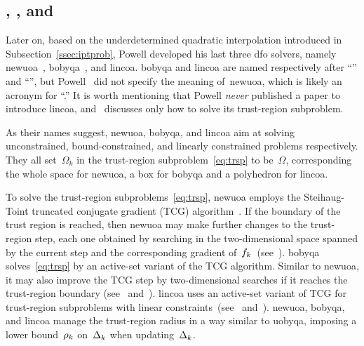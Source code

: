 \documentclass[
    smallextended,  %
    final,        %
]{svjour3}
\newcommand{\fsetm}[1][k]{\Omega_{#1}}
\newcommand{\fset}{\Omega}
\newcommand{\objm}[1][k]{\obj\ifthenelse{\equal{#1}{}}{}{_{#1}}}
\newcommand{\obj}{f}
\newcommand{\rad}[1][k]{\Delta\ifthenelse{\equal{#1}{}}{}{_{#1}}}
\newcommand{\radlb}[1][k]{\rho\ifthenelse{\equal{#1}{}}{}{_{#1}}}
\begin{document}
\subsection{, , and }
\label{ssec:nbloa}

Later on, based on the underdetermined quadratic interpolation introduced in Subsection~\ref{ssec:iptprob},
Powell developed his last three \gls{dfo} solvers, namely \gls{newuoa}~\cite{Powell_2006,Powell_2008}, \gls{bobyqa}~\cite{Powell_2009}, and \gls{lincoa}.
\Gls{bobyqa} and \gls{lincoa} are named respectively after ``'' and
``'', but Powell~\cite{Powell_2006,Powell_2008} did not specify the meaning
of~\gls{newuoa}, which is likely an acronym for ``.''
It is worth mentioning that Powell \emph{never} published a paper to introduce \gls{lincoa},
and~\cite{Powell_2015} discusses only how to solve its trust-region subproblem.

As their names suggest, \gls{newuoa}, \gls{bobyqa}, and \gls{lincoa} aim at solving unconstrained,
bound-constrained, and linearly constrained problems respectively.
They all set~$\fsetm$ in the trust-region subproblem~\eqref{eq:trsp} to be~$\fset$, corresponding the whole space for \gls{newuoa}, a box for \gls{bobyqa} and a polyhedron for \gls{lincoa}.

To solve the trust-region subproblems~\eqref{eq:trsp}, \gls{newuoa} employs the
Steihaug-Toint truncated conjugate gradient (TCG) algorithm~\cite{Steihaug_1983,Toint_1981}.
If the boundary of the trust region is reached, then \gls{newuoa} may make further
changes to the trust-region step, each one obtained by searching in the two-dimensional space
spanned by the current step and the corresponding gradient of~$\objm[k]$~(see~\cite[\S~5]{Powell_2006}).
\gls{bobyqa} solves~\eqref{eq:trsp} by an active-set variant of the TCG algorithm. Similar to
\gls{newuoa}, it may also improve the TCG step by two-dimensional searches if it reaches the
trust-region boundary (see~\mbox{\cite[\S~3]{Powell_2009}} and~\cite[\S~6.2.1]{Ragonneau_2022}).
\gls{lincoa} uses an active-set variant of TCG for trust-region subproblems with linear
constraints~(see~\cite[\S~3 and \S~5]{Powell_2015} and~\mbox{\cite[\S~6.2.2]{Ragonneau_2022})}.
\gls{newuoa}, \gls{bobyqa}, and \gls{lincoa} manage the trust-region radius in a way similar to
\gls{uobyqa}, imposing a lower bound~$\radlb$ on~$\rad$ when updating~$\rad$.
\end{document}
